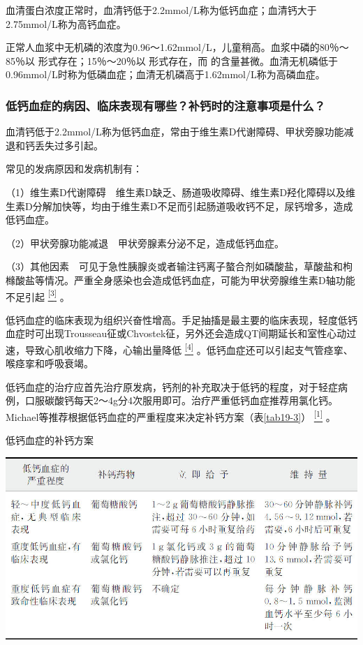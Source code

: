 血清蛋白浓度正常时，血清钙低于2.2mmol/L称为低钙血症；血清钙大于2.75mmol/L称为高钙血症。

正常人血浆中无机磷的浓度为0.96～1.62mmol/L，儿童稍高。血浆中磷的80％～85％以
形式存在；15％～20％以
形式存在，而
的含量甚微。血清无机磷低于0.96mmol/L时称为低磷血症；血清无机磷高于1.62mmol/L称为高磷血症。

\subsubsection{低钙血症的病因、临床表现有哪些？补钙时的注意事项是什么？}

血清钙低于2.2mmol/L称为低钙血症，常由于维生素D代谢障碍、甲状旁腺功能减退和钙丢失过多引起。

常见的发病原因和发病机制有：

（1）维生素D代谢障碍　维生素D缺乏、肠道吸收障碍、维生素D羟化障碍以及维生素D分解加快等，均由于维生素D不足而引起肠道吸收钙不足，尿钙增多，造成低钙血症。

（2）甲状旁腺功能减退　甲状旁腺素分泌不足，造成低钙血症。

（3）其他因素　可见于急性胰腺炎或者输注钙离子螯合剂如磷酸盐，草酸盐和枸橼酸盐等情况。严重全身感染也会造成低钙血症，可能为甲状旁腺维生素D轴功能不足引起
\protect\hyperlink{text00025.htmlux5cux23ch3-24}{\textsuperscript{{[}3{]}}}
。

低钙血症的临床表现为组织兴奋性增高。手足抽搐是最主要的临床表现，轻度低钙血症时可出现Trousseau征或Chvostek征，另外还会造成QT间期延长和室性心动过速，导致心肌收缩力下降，心输出量降低
\protect\hyperlink{text00025.htmlux5cux23ch4-24}{\textsuperscript{{[}4{]}}}
。低钙血症还可以引起支气管痉挛、喉痉挛和呼吸衰竭。

低钙血症的治疗应首先治疗原发病，钙剂的补充取决于低钙的程度，对于轻症病例，口服碳酸钙每天2～4g分4次服用即可。治疗严重低钙血症推荐用氯化钙。Michael等推荐根据低钙血症的严重程度来决定补钙方案（表\ref{tab19-3}）
\protect\hyperlink{text00025.htmlux5cux23ch1-24}{\textsuperscript{{[}1{]}}}
。

\begin{table}[htbp]
\centering
\caption{低钙血症的补钙方案}
\label{tab19-3}
\includegraphics{./images/Image00166.jpg}
\end{table}

